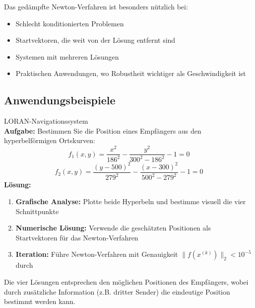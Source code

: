 \begin{remark}
Das gedämpfte Newton-Verfahren ist besonders nützlich bei:
\begin{itemize}
    \item Schlecht konditionierten Problemen
    \item Startvektoren, die weit von der Lösung entfernt sind  
    \item Systemen mit mehreren Lösungen
    \item Praktischen Anwendungen, wo Robustheit wichtiger als Geschwindigkeit ist
\end{itemize}
\end{remark}

\raggedcolumns

\subsection{Anwendungsbeispiele}

\begin{example2}{LORAN-Navigationssystem}\\
\textbf{Aufgabe:} Bestimmen Sie die Position eines Empfängers aus den hyperbelförmigen Ortskurven:
$$f_1(x,y) = \frac{x^2}{186^2} - \frac{y^2}{300^2 - 186^2} - 1 = 0$$
$$f_2(x,y) = \frac{(y-500)^2}{279^2} - \frac{(x-300)^2}{500^2 - 279^2} - 1 = 0$$
\tcblower
\textbf{Lösung:}
\begin{enumerate}
    \item \textbf{Grafische Analyse:} Plotte beide Hyperbeln und bestimme visuell die vier Schnittpunkte
    \item \textbf{Numerische Lösung:} Verwende die geschätzten Positionen als Startvektoren für das Newton-Verfahren
    \item \textbf{Iteration:} Führe Newton-Verfahren mit Genauigkeit $\|f(x^{(k)})\|_2 < 10^{-5}$ durch
\end{enumerate}

Die vier Lösungen entsprechen den möglichen Positionen des Empfängers, wobei durch zusätzliche Information (z.B. dritter Sender) die eindeutige Position bestimmt werden kann.
\end{example2}

